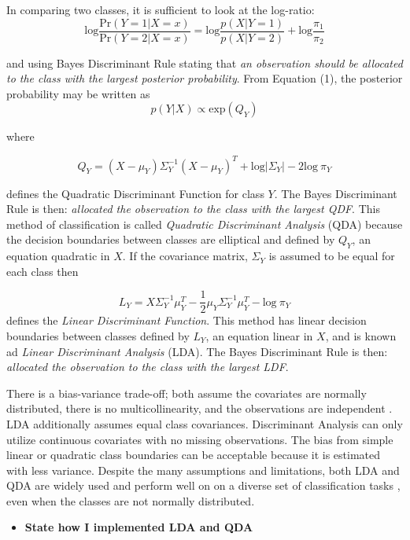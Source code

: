 \documentclass[12pt,]{article}
\providecommand{\tightlist}{%
  \setlength{\itemsep}{0pt}\setlength{\parskip}{0pt}}
\begin{document}
In comparing two classes, it is sufficient to look at the log-ratio: \[
\text{log} \frac{\text{Pr}(Y=1 \vert X=x)}{\text{Pr}(Y=2 \vert X=x)} = \text{log}\frac{p(X \vert Y=1)}{p(X \vert Y=2)} + \text{log}\frac{\pi_1}{\pi_2}   \tag{3}
\]

and using Bayes Discriminant Rule stating that \emph{an observation
should be allocated to the class with the largest posterior
probability}. From Equation (1), the posterior probability may be
written as \[
p(Y \vert X) \propto \text{exp} \left( Q_Y \right)    \tag{4}
\]

where

\[
Q_Y = (X - \mu_Y) \Sigma^{-1}_Y (X - \mu_Y)^T + \text{log} \vert \Sigma_Y \vert - 2\text{log} ~\pi_Y   \tag{5}
\]

defines the Quadratic Discriminant Function for class \(Y\). The Bayes
Discriminant Rule is then: \emph{allocated the observation to the class
with the largest QDF}. This method of classification is called
\emph{Quadratic Discriminant Analysis} (QDA) because the decision
boundaries between classes are elliptical and defined by \(Q_Y\), an
equation quadratic in \(X\). If the covariance matrix, \(\Sigma_Y\) is
assumed to be equal for each class then

\[
L_Y = X \Sigma^{-1}_Y \mu_Y^T -\frac{1}{2}\mu_Y \Sigma^{-1}_Y \mu_Y^T  - \text{log} ~\pi_Y     \tag{6}
\] defines the \emph{Linear Discriminant Function}. This method has
linear decision boundaries between classes defined by \(L_Y\), an
equation linear in \(X\), and is known ad \emph{Linear Discriminant
Analysis} (LDA). The Bayes Discriminant Rule is then: \emph{allocated
the observation to the class with the largest LDF}.

There is a bias-variance trade-off; both assume the covariates are
normally distributed, there is no multicollinearity, and the
observations are independent \autocite{cover_geometrical_1965}. LDA
additionally assumes equal class covariances. Discriminant Analysis can
only utilize continuous covariates with no missing observations. The
bias from simple linear or quadratic class boundaries can be acceptable
because it is estimated with less variance. Despite the many assumptions
and limitations, both LDA and QDA are widely used and perform well on on
a diverse set of classification tasks \autocite{hastie_elements_2009},
even when the classes are not normally distributed.

\begin{itemize}
\tightlist
\item
  \textbf{State how I implemented LDA and QDA}
\end{itemize}
\end{document}
